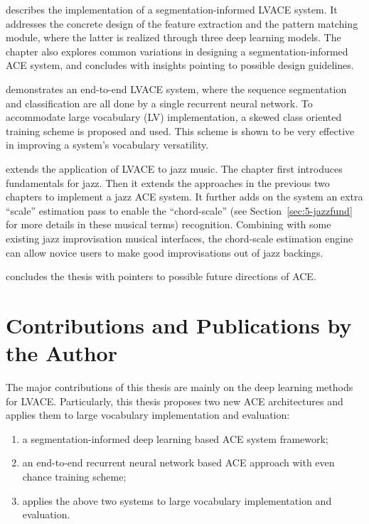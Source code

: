  describes the implementation of a segmentation-informed LVACE system. It addresses the concrete design of the feature extraction and the pattern matching module, where the latter is realized through three deep learning models. The chapter also explores common variations in designing a segmentation-informed ACE system, and concludes with insights pointing to possible design guidelines.

 demonstrates an end-to-end LVACE system, where the sequence segmentation and classification are all done by a single recurrent neural network. To accommodate large vocabulary (LV) implementation, a skewed class oriented training scheme is proposed and used. This scheme is shown to be very effective in improving a system's vocabulary versatility.

 extends the application of LVACE to jazz music. The chapter first introduces fundamentals for jazz. Then it extends the approaches in the previous two chapters to implement a jazz ACE system. It further adds on the system an extra ``scale'' estimation pass to enable the ``chord-scale'' (see Section~\ref{sec:5-jazzfund} for more details in these musical terms) recognition. Combining with some existing jazz improvisation musical interfaces, the chord-scale estimation engine can allow novice users to make good improvisations out of jazz backings.

 concludes the thesis with pointers to possible future directions of ACE.


\section{Contributions and Publications by the Author} \label{sec:1-contribution}
The major contributions of this thesis are mainly on the deep learning methods for LVACE. Particularly, this thesis proposes two new ACE architectures and applies them to large vocabulary implementation and evaluation:
\begin{enumerate}
\item a segmentation-informed deep learning based ACE system framework;
\item an end-to-end recurrent neural network based ACE approach with even chance training scheme;
\item applies the above two systems to large vocabulary implementation and evaluation.
\end{enumerate}

